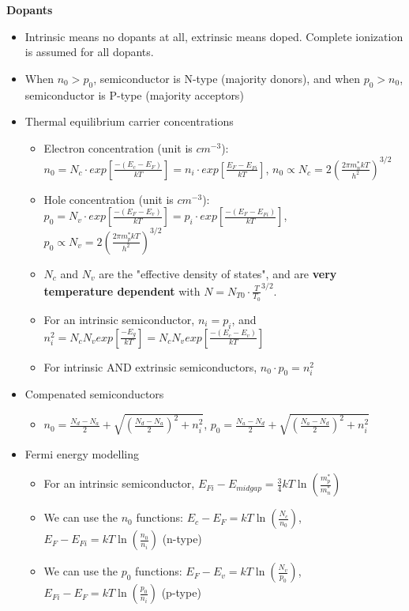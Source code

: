 \documentclass{article}
\begin{document}
\textbf{Dopants}
\begin{itemize}
    \item Intrinsic means no dopants at all, extrinsic means doped. Complete ionization is assumed for all dopants.
    \item When $n_0 > p_0$, semiconductor is N-type (majority donors), and when $p_0 > n_0$, semiconductor is P-type (majority acceptors)
    \item Thermal equilibrium carrier concentrations
    \begin{itemize}
        \item Electron concentration (unit is $cm^{-3}$): $n_0 = N_c \cdot exp\left[\frac{-(E_c - E_F)}{kT}\right] = n_i \cdot exp\left[\frac{E_F - E_{Fi}}{kT}\right]$, $n_0 \propto N_c = 2\left(\frac{2 \pi m_n^* kT}{h^2}\right)^{3/2}$
        \item Hole concentration (unit is $cm^{-3}$): $p_0 = N_v \cdot exp\left[\frac{-(E_F - E_v)}{kT}\right] = p_i \cdot exp\left[\frac{-(E_F - E_{Fi})}{kT}\right]$, $p_0 \propto N_v = 2\left(\frac{2 \pi m_p^* kT}{h^2}\right)^{3/2}$
        \item $N_c$ and $N_v$ are the "effective density of states", and are \textbf{very temperature dependent} with $N = N_{T0} \cdot \frac{T}{T_0}^{3/2}$.
        \item For an intrinsic semiconductor, $n_i = p_i$, and $n_i^2 = N_c N_v exp\left[\frac{-E_g}{kT}\right] = N_c N_v exp\left[\frac{-(E_c - E_v)}{kT}\right]$
        \item For intrinsic AND extrinsic semiconductors, $n_0 \cdot p_0 = n_i^2$
    \end{itemize}
    \item Compenated semiconductors
    \begin{itemize}
        \item $n_0 = \frac{N_d - N_a}{2} + \sqrt{\left(\frac{N_d - N_a}{2}\right)^2 + n_i^2}$, $p_0 = \frac{N_a - N_d}{2} + \sqrt{\left(\frac{N_a - N_d}{2}\right)^2 + n_i^2}$
    \end{itemize}
    \item Fermi energy modelling
    \begin{itemize}
        \item For an intrinsic semiconductor, $E_{Fi} - E_{midgap} = \frac{3}{4} kT \ln \left(\frac{m_p^*}{m_n^*}\right)$
        \item We can use the $n_0$ functions: $E_c - E_F = kT \ln \left(\frac{N_c}{n_0}\right)$, $E_F - E_{Fi} = kT \ln \left(\frac{n_0}{n_i}\right)$ (n-type)
        \item We can use the $p_0$ functions: $E_F - E_v = kT \ln \left(\frac{N_v}{p_0}\right)$, $E_{Fi} - E_F = kT \ln \left(\frac{p_0}{n_i}\right)$ (p-type)
    \end{itemize}
\end{itemize}
\end{document}
